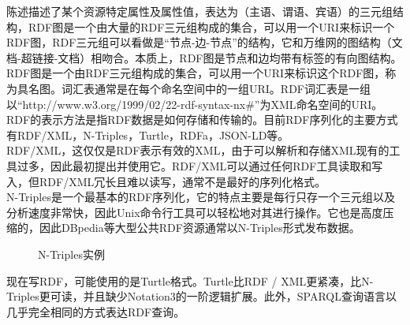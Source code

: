      \indent
     陈述描述了某个资源特定属性及属性值，表达为（主语、谓语、宾语）的三元组结构，RDF图是一个由大量的RDF三元组构成的集合，可以用一个URI来标识一个RDF图，RDF三元组可以看做是“节点-边-节点”的结构，它和万维网的图结构（文档-超链接-文档）相吻合。本质上，RDF图是节点和边均带有标签的有向图结构。\\
     \indent
     RDF图是一个由RDF三元组构成的集合，可以用一个URI来标识这个RDF图，称为具名图。词汇表通常是在每个命名空间中的一组URI。RDF词汇表是一组以“http://www.w3.org/1999/02/22-rdf-syntax-nx\#”为XML命名空间的URI。\\
     \indent
     RDF的表示方法是指RDF数据是如何存储和传输的。目前RDF序列化的主要方式有RDF/XML，N-Triples，Turtle，RDFa，JSON-LD等。\\
     \indent
     RDF/XML，这仅仅是RDF表示有效的XML，由于可以解析和存储XML现有的工具过多，因此最初提出并使用它。RDF/XML可以通过任何RDF工具读取和写入，但RDF/XML冗长且难以读写，通常不是最好的序列化格式。\\
     \indent
     N-Triples是一个最基本的RDF序列化，它的特点主要是每行只存一个三元组以及分析速度非常快，因此Unix命令行工具可以轻松地对其进行操作。它也是高度压缩的，因此DBpedia等大型公共RDF资源通常以N-Triples形式发布数据。\\

    \begin{figure}[htb]
    \caption{\label{1} N-Triples实例}
    \end{figure}

    \indent
    现在写RDF，可能使用的是Turtle格式。Turtle比RDF / XML更紧凑，比N-Triples更可读，并且缺少Notation3的一阶逻辑扩展。此外，SPARQL查询语言以几乎完全相同的方式表达RDF查询。\\
